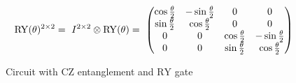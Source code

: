  \begin{equation}
     \centering
     \begin{split}
        \mathrm{RY}(\theta)^{2\times2} =\ I^{2\times2}\otimes\mathrm{RY}(\theta) =\  \begin{pmatrix}
        \cos{\frac{\theta}{2}} & -\sin{\frac{\theta}{2}} & 0 & 0\\
        \sin{\frac{\theta}{2}} & \cos{\frac{\theta}{2}} & 0 & 0 \\
        0 & 0 & \cos{\frac{\theta}{2}} & -\sin{\frac{\theta}{2}}\\
        0 & 0 & \sin{\frac{\theta}{2}} & \cos{\frac{\theta}{2}}\\
    \end{pmatrix}\\
     \end{split}
     \label{equation:2_x_2_ry}
 \end{equation}

\begin{figure}[!ht]
    \centering
    \caption{Circuit with $\mathrm{CZ}$ entanglement and $\mathrm{RY}$ gate}
    \label{fig:circuit_cz_entangled_ry_gate}
\end{figure}

